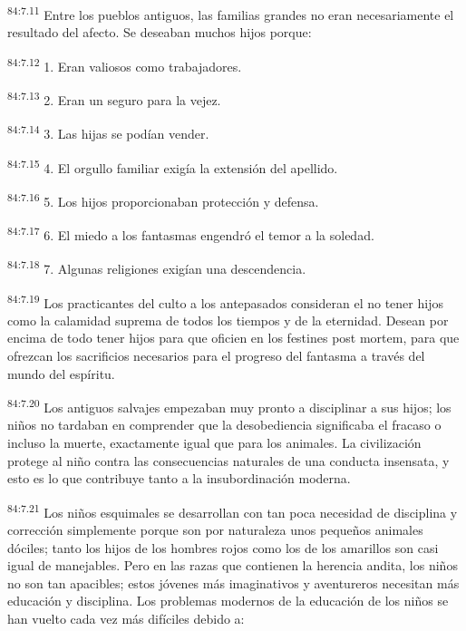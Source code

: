 \par
\textsuperscript{84:7.11} Entre los pueblos antiguos, las familias grandes no eran necesariamente el resultado del afecto. Se deseaban muchos hijos porque:

\par
\textsuperscript{84:7.12} 1. Eran valiosos como trabajadores.

\par
\textsuperscript{84:7.13} 2. Eran un seguro para la vejez.

\par
\textsuperscript{84:7.14} 3. Las hijas se podían vender.

\par
\textsuperscript{84:7.15} 4. El orgullo familiar exigía la extensión del apellido.

\par
\textsuperscript{84:7.16} 5. Los hijos proporcionaban protección y defensa.

\par
\textsuperscript{84:7.17} 6. El miedo a los fantasmas engendró el temor a la soledad.

\par
\textsuperscript{84:7.18} 7. Algunas religiones exigían una descendencia.

\par
\textsuperscript{84:7.19} Los practicantes del culto a los antepasados consideran el no tener hijos como la calamidad suprema de todos los tiempos y de la eternidad. Desean por encima de todo tener hijos para que oficien en los festines post mortem, para que ofrezcan los sacrificios necesarios para el progreso del fantasma a través del mundo del espíritu.

\par
\textsuperscript{84:7.20} Los antiguos salvajes empezaban muy pronto a disciplinar a sus hijos; los niños no tardaban en comprender que la desobediencia significaba el fracaso o incluso la muerte, exactamente igual que para los animales. La civilización protege al niño contra las consecuencias naturales de una conducta insensata, y esto es lo que contribuye tanto a la insubordinación moderna.

\par
\textsuperscript{84:7.21} Los niños esquimales se desarrollan con tan poca necesidad de disciplina y corrección simplemente porque son por naturaleza unos pequeños animales dóciles; tanto los hijos de los hombres rojos como los de los amarillos son casi igual de manejables. Pero en las razas que contienen la herencia andita, los niños no son tan apacibles; estos jóvenes más imaginativos y aventureros necesitan más educación y disciplina. Los problemas modernos de la educación de los niños se han vuelto cada vez más difíciles debido a:

